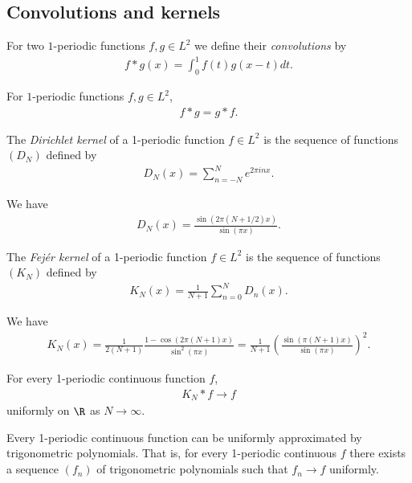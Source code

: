 \documentclass{article}
\begin{document}
\subsection{Convolutions and kernels}

\begin{definition}
    For two $1$-periodic functions $f,g\in L^2$ we define their \emph{convolutions} 
    by 
    \begin{align*}
        f*g(x)=\int_0^1 f(t)g(x-t)dt.
    \end{align*} 
\end{definition}

\begin{lemma}[Notes 5.2]
    For $1$-periodic functions $f,g\in L^2$, 
    \begin{align*}
        f*g=g*f.
    \end{align*}
\end{lemma}

\begin{definition}
    The \emph{Dirichlet kernel} of a 1-periodic function $f\in L^2$ is the sequence of functions
    $(D_N)$ defined by
    \begin{align*}
        D_N(x)=\sum_{n=-N}^N e^{2\pi inx}.
    \end{align*}
\end{definition}

\begin{lemma}[Notes 5.3]
    We have 
    \begin{align*}
        D_N(x)=\frac{\sin(2\pi(N+1/2)x)}{\sin(\pi x)}.
    \end{align*} 
\end{lemma}

\begin{definition}
    The \emph{Fej\'er kernel} of a 1-periodic function $f\in L^2$ is the sequence of functions
    $(K_N)$ defined by
    \begin{align*}
        K_N(x)=\frac{1}{N+1}\sum_{n=0}^ND_n(x).
    \end{align*}
\end{definition}

\begin{lemma}[Notes 5.4]
    We have
    \begin{align*}
        K_N(x)=\frac{1}{2(N+1)}\frac{1-\cos(2\pi(N+1)x)}{\sin^2(\pi x)}
        =\frac{1}{N+1}\left(\frac{\sin(\pi(N+1)x)}{\sin(\pi x)}\right)^2.
    \end{align*} 
\end{lemma}

\begin{theorem}[Fej\'er]
    For every 1-periodic continuous function $f$,
    \begin{align*}
        K_N*f\to f
    \end{align*} 
    uniformly on $\R$ as $N\to \infty$.
\end{theorem}

\begin{corollary*}
    Every 1-periodic continuous function can be uniformly approximated by trigonometric
    polynomials. That is, for every 1-periodic continuous $f$ there exists a sequence 
    $(f_n)$ of trigonometric polynomials such that $f_n\to f$ uniformly. 
\end{corollary*}
\end{document}
